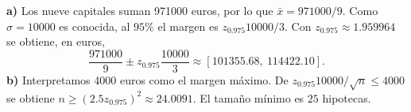 \textbf{a)} Los nueve capitales suman 971000 euros,
por lo que $\bar x=971000/9$. Como $\sigma=10000$ es
conocida, al $95\%$ el margen es $z_{0.975}10000/3$.
Con $z_{0.975}\approx1.959964$ se obtiene, en euros,
\[
\frac{971000}{9}\pm z_{0.975}\frac{10000}{3}
\approx\boxed{[101355.68,\ 114422.10]}.
\]
\textbf{b)} Interpretamos 4000 euros como el margen máximo.
De $z_{0.975}10000/\sqrt n\le4000$ se obtiene
$n\ge(2.5z_{0.975})^2\approx24.0091$.
El tamaño mínimo es $\boxed{25}$ hipotecas.
